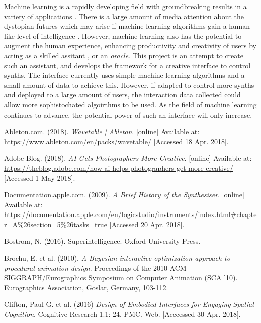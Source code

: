 \documentclass[11pt, oneside]{report}   	%
\begin{document}
{Machine learning is a rapidly developing field with groundbreaking results in a variety of applications \cite{Automation}. There is a large amount of media attention about the dystopian futures which may arise if machine learning algorithms gain a human-like level of intelligence \cite{Bostrom}. However, machine learning also has the potential to augment the human experience, enhancing productivity and creativity of users by acting as a skilled assitant \cite{AudioEffects2, AdobeBlog}, or an \emph{oracle}. This project is an attempt to create such an assistant, and develops the framework for a creative interface to control synths. The interface currently uses simple machine learning algorithms and a small amount of data to achieve this. However, if adapted to control more synths and deployed to a large amount of users, the interaction data collected could allow more sophistochated algoirthms to be used. As the field of machine learning continues to advance, the potential power of such an interface will only increase.

\begin{thebibliography}{9}
\singlespacing

Ableton.com. (2018). \emph{Wavetable | Ableton}. [online] Available at: \url{https://www.ableton.com/en/packs/wavetable/} [Accessed 18 Apr. 2018].

Adobe Blog. (2018). \emph{AI Gets Photographers More Creative}. [online] Available at: \url{https://theblog.adobe.com/how-ai-helps-photographers-get-more-creative/} [Accessed 1 May 2018].

Documentation.apple.com. (2009). \emph{A Brief History of the Synthesiser}. [online] Available at: \url{https://documentation.apple.com/en/logicstudio/instruments/index.html#chapter=A\%26section=5\%26tasks=true} [Accessed 20 Apr. 2018].

Bostrom, N. (2016). Superintelligence. Oxford University Press.

Brochu, E. et al. (2010). \emph{A Bayesian interactive optimization approach to procedural animation design}. Proceedings of the 2010 ACM SIGGRAPH/Eurographics Symposium on Computer Animation (SCA '10). Eurographics Association, Goslar, Germany, 103-112.

Clifton, Paul G. et al. (2016) \emph{Design of Embodied Interfaces for Engaging Spatial Cognition}. Cognitive Research 1.1: 24. PMC. Web. [Acccessed 30 Apr. 2018].


\end{thebibliography}}
\end{document}
